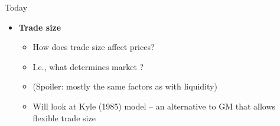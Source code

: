 \documentclass[english,10pt
,aspectratio=169
]{beamer}
\begin{document}
\begin{frame}{Today}
	\begin{itemize}
		\item \textbf{Trade size}
		\begin{itemize}
			\item How does trade size affect prices? 
			\item I.e., what determines market ?
			\item (Spoiler: mostly the same factors as with liquidity)
			\item Will look at Kyle (1985) model -- an alternative to GM that allows flexible trade size
		\end{itemize}
	\end{itemize}
\end{frame}



\end{document}

